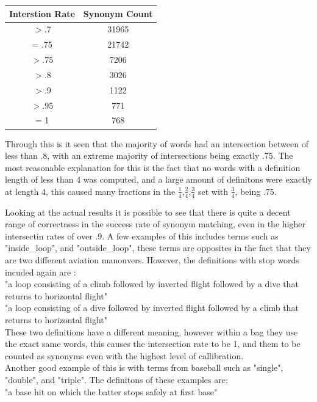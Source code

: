 \documentclass{article}
\begin{document}
\begin{addmargin}[4em]{4em}
\begin{center}
 \begin{tabular}{||c | c||} 
 \hline
 Interstion Rate & Synonym Count \\ [0.5ex] 
 \hline\hline
$>$.7 & 31965 \\ 
 \hline
= .75 & 21742 \\
 \hline
$>$.75 & 7206 \\
 \hline
$>$.8 & 3026 \\
 \hline
$>$.9 & 1122 \\
 \hline
$>$.95 & 771 \\
 \hline
= 1 & 768 \\ [1ex] 
 \hline
\end{tabular}
\end{center}

Through this is it seen that the majority of words had an intersection between of less than .8, with an extreme majority of intersections being exactly .75. The most reasonable explanation for this is the fact that no words with a definition length of less than 4 was computed, and a large amount of definitons were exactly at length 4, this caused many fractions in the $\frac{1}{4}$,$\frac{2}{4}$,$\frac{3}{4}$ set with $\frac{3}{4}$, being .75.
\par Looking at the actual results it is possible to see that there is quite a decent range of correctness in the success rate of synonym matching, even in the higher intersectin rates of over .9. A few examples of this includes terms such as "inside\_loop", and "outside\_loop", these terms are opposites in the fact that they are two different aviation manouvers. However, the definitions with stop words incuded again are :
\\"a loop consisting of a climb followed by inverted flight followed by a dive that returns to horizontal flight"
\\"a loop consisting of a dive followed by inverted flight followed by a climb that returns to horizontal flight"
\\ These two definitions have a different meaning, however within a bag they use the exact same words, this causes the intersection rate to be 1, and them to be counted as synonyms even with the highest level of callibration.
\\ Another good example of this is with terms from baseball such as "single", "double", and  "triple". The definitons of these examples are:
\\"a base hit on which the batter stops safely at first base"

\end{addmargin}
\end{document}
